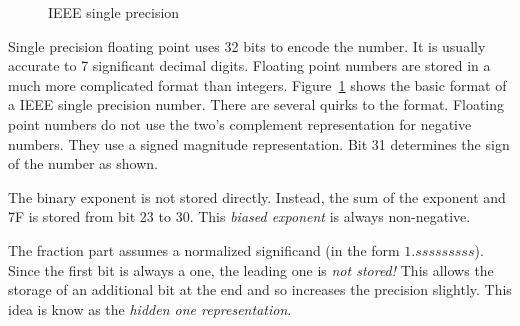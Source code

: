 \begin{figure}[t]
\caption{IEEE single precision\label{fig:IEEEsingle}}
\end{figure}

Single precision floating point uses 32 bits to encode the number. It is
usually accurate to 7 significant decimal digits. Floating point num\-bers are
stored in a much more complicated format than integers. 
Figure~\ref{fig:IEEEsingle} shows the basic format of a IEEE single precision
number. There are several quirks to the format. Floating point numbers do
not use the two's complement representation for negative numbers. They use
a signed magnitude representation. Bit 31 determines the sign of the number
as shown.

The binary exponent is not stored directly. Instead, the sum of the
exponent and 7F is stored from bit 23 to 30. This
\emph{biased exponent} is always non-negative.

The fraction part assumes a normalized significand (in the form 
$1.sssssssss$). Since the first bit is always a one, the leading one is
\emph{not stored!} This allows the storage of an additional bit at the end
and so increases the precision slightly. This idea is know as the
\emph{hidden one representation}.

